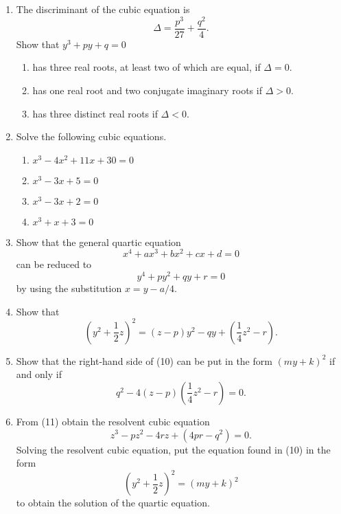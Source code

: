 {\begin{enumerate}
\item
The {\bfi discriminant\/} of the cubic equation is  
\[
\Delta = \frac{p^3}{27}  + \frac{q^2}{4}.
\]
Show that $y^3 + py + q=0$ 
\begin{enumerate}
 
\item
has three real roots, at least two of which are equal, if $\Delta = 0$.
 
\item
has one real root and two conjugate imaginary roots if $\Delta > 0$.
 
\item
has three distinct real roots if $\Delta < 0$.
 
\end{enumerate}

\item
Solve the following cubic equations.
\begin{multicols}{2}
\begin{enumerate}

\item 
$x^3 - 4x^2 + 11 x + 30 = 0$

\item 
$x^3 - 3x +5 = 0$

\item 
$x^3 - 3x +2 = 0$

\item 
$x^3 + x + 3 = 0$

\end{enumerate}

\end{multicols} 
 
\item
Show that the general quartic equation
\[
x^4 + ax^3 + bx^2 + cx + d =0
\]
can be reduced to
\[
y^4 + py^2 + qy + r = 0
\]
by using the substitution $x = y - a/4$.
 
 
\item
Show that
\[
\left(
y^2 + \frac{1}{2} z
\right)^2 =
(z - p)y^2 - qy + 
\left(
\frac{1}{4} z^2 - r
\right).
\] 
 
\item
Show that the right-hand side of (10) can be put in the form $(my + k)^2$ if and only if
\[
q^2 - 4(z - p)\left(
\frac{1}{4} z^2 - r
\right) = 0.
\]
 
\item
From (11) obtain the {\bfi resolvent cubic equation}
\[
z^3 - pz^2 - 4rz + (4pr - q^2) = 0.
\]
Solving the resolvent cubic equation, put the equation found in (10) in the form
\[
\left(
y^2 + \frac{1}{2} z
\right)^2 
=
(my + k)^2
\] 
to obtain the solution of the quartic equation.


\end{enumerate}}
